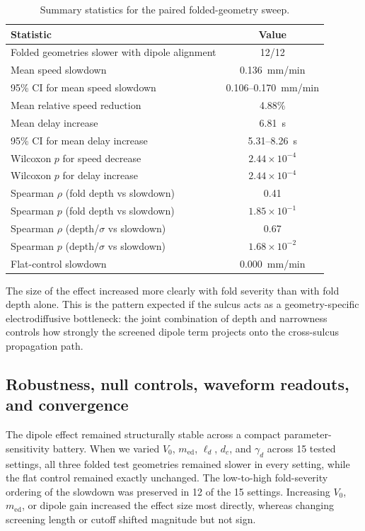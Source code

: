 \documentclass[12pt]{article}
\begin{document}
\begin{table}[t]
\centering
\caption{Summary statistics for the paired folded-geometry sweep.}
\label{tab:stats}
\begin{tabular}{@{}lc@{}}
\toprule
Statistic & Value \\
\midrule
Folded geometries slower with dipole alignment & 12/12 \\
Mean speed slowdown & 0.136~mm/min \\
95\% CI for mean speed slowdown & 0.106--0.170~mm/min \\
Mean relative speed reduction & 4.88\% \\
Mean delay increase & 6.81~s \\
95\% CI for mean delay increase & 5.31--8.26~s \\
Wilcoxon $p$ for speed decrease & $2.44\times 10^{-4}$ \\
Wilcoxon $p$ for delay increase & $2.44\times 10^{-4}$ \\
Spearman $\rho$ (fold depth vs slowdown) & 0.41 \\
Spearman $p$ (fold depth vs slowdown) & $1.85\times 10^{-1}$ \\
Spearman $\rho$ (depth/$\sigma$ vs slowdown) & 0.67 \\
Spearman $p$ (depth/$\sigma$ vs slowdown) & $1.68\times 10^{-2}$ \\
Flat-control slowdown & 0.000~mm/min \\
\bottomrule
\end{tabular}
\end{table}

The size of the effect increased more clearly with fold severity than with fold depth alone. This is the pattern expected if the sulcus acts as a geometry-specific electrodiffusive bottleneck: the joint combination of depth and narrowness controls how strongly the screened dipole term projects onto the cross-sulcus propagation path.

\subsection{Robustness, null controls, waveform readouts, and convergence}

The dipole effect remained structurally stable across a compact parameter-sensitivity battery. When we varied $V_0$, $m_{\mathrm{ed}}$, $\ell_d$, $d_c$, and $\gamma_d$ across 15 tested settings, all three folded test geometries remained slower in every setting, while the flat control remained exactly unchanged. The low-to-high fold-severity ordering of the slowdown was preserved in 12 of the 15 settings. Increasing $V_0$, $m_{\mathrm{ed}}$, or dipole gain increased the effect size most directly, whereas changing screening length or cutoff shifted magnitude but not sign.
\end{document}
